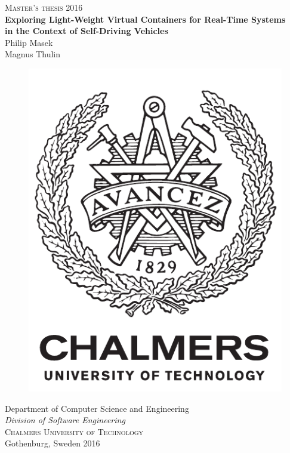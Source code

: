  
\newpage
\thispagestyle{empty}
\begin{center}
	\textsc{\large Master's thesis 2016}\\[4cm]		%
	\textbf{\Large 	Exploring Light-Weight Virtual Containers for Real-Time Systems \\[0cm]
					in the Context of Self-Driving Vehicles} \\[1cm]

	{\Large Philip Masek}\\[0.4cm]
	{\Large Magnus Thulin}
	
	\vfill	
	\begin{figure}[H]
	\centering
	\includegraphics[width=0.2\pdfpagewidth]{figure/auxiliary/logo_eng.pdf} \\	
	\end{figure}	\vspace{5mm}	
	
	Department of Computer Science and Engineering \\
	\emph{Division of Software Engineering}\\
	\textsc{Chalmers University of Technology} \\
	Gothenburg, Sweden 2016 \\
\end{center}


